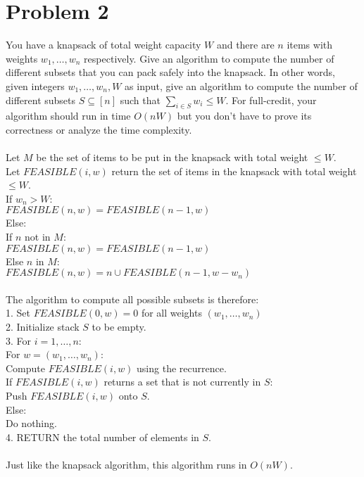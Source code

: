 \documentclass[10pt,letterpaper]{article}
\newcommand\tab[1][0.5cm]{\hspace*{#1}}
\begin{document}
\section{Problem 2}
You have a knapsack of total weight capacity $W$ and there are $n$ items with weights $w_1,\ldots,w_n$ respectively.  Give an algorithm to compute the number of different subsets that you can pack safely into the knapsack. In other words, given integers $w_1, \ldots, w_n, W$ as input, give an algorithm to compute the number of different subsets $S \subseteq [n]$ such that $\sum_{i \in S} w_i \leq W$.  For full-credit, your algorithm should run in time $O(nW)$ but you don't have to prove its correctness or analyze the time complexity.\\\\
Let $M$ be the set of items to be put in the knapsack with total weight $\leq W$.\\
Let $FEASIBLE(i,w)$ return the set of items in the knapsack with total weight $\leq W$. \\
If $w_n > W$:\\
\tab $FEASIBLE(n,w)=FEASIBLE(n-1,w)$\\
Else:\\
\tab If $n$ not in $M$:\\
\tab \tab $FEASIBLE(n,w)=FEASIBLE(n-1,w)$\\
\tab Else $n$ in $M$:\\
\tab \tab $FEASIBLE(n,w)=n \cup FEASIBLE(n-1,w-w_n)$\\\\
The algorithm to compute all possible subsets is therefore:\\
1. Set $FEASIBLE(0,w)=0$ for all weights $(w_1,\dots,w_n)$\\
2. Initialize stack $S$ to be empty.\\
3. For $i=1,\dots,n$:\\
\tab For $w=(w_1,\dots,w_n)$:\\
\tab \tab Compute $FEASIBLE(i,w)$ using the recurrence.\\
\tab \tab If $FEASIBLE(i,w)$ returns a set that is not currently in $S$:\\
\tab \tab \tab Push $FEASIBLE(i,w)$ onto $S$.\\
\tab \tab Else:\\
\tab \tab \tab Do nothing. \\
4. RETURN the total number of elements in $S$.\\\\
Just like the knapsack algorithm, this algorithm runs in $O(nW)$.
\end{document}
